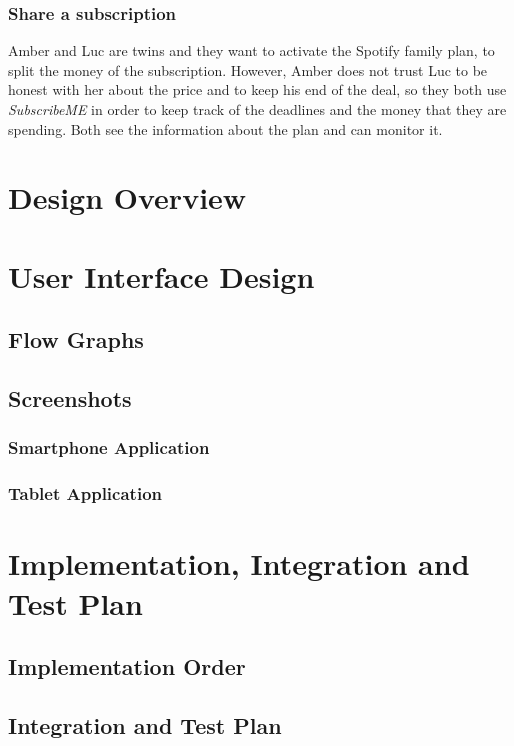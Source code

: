 \documentclass[11pt]{article}
\begin{document}
\subsubsection{Share a subscription}
Amber and Luc are twins and they want to activate the Spotify family plan, to split the money of the subscription. However, Amber does not trust Luc to be honest with her about the price and to keep his end of the deal, so they both use \textit{SubscribeME} in order to keep track of the deadlines and the money that they are spending. Both see the information about the plan and can monitor it.

\newpage
\section{Design Overview}\label{sec:design}

\newpage
\section{User Interface Design}\label{sec:ui}
\subsection{Flow Graphs}

\subsection{Screenshots}
\subsubsection{Smartphone Application}

\subsubsection{Tablet Application}

\newpage
\section{Implementation, Integration and Test Plan}\label{sec:test}
\subsection{Implementation Order}

\subsection{Integration and Test Plan}
\end{document}
